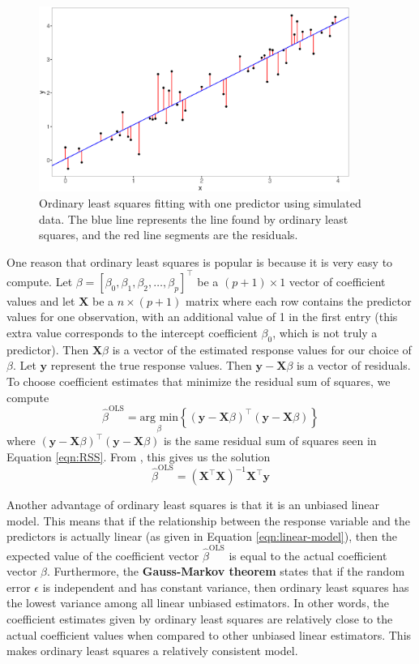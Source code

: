 \documentclass{article}
\newcommand{\argmin}[2]{\underset{#1}{\text{arg min}}\left\{#2\right\}}
\begin{document}
\begin{figure}[!h]
	\centering
	\includegraphics[width = 4in]{images/ols.eps}
	\captionsetup{width=4in}
	\caption{Ordinary least squares fitting with one predictor using simulated data. The blue line represents the line found by ordinary least squares, and the red line segments are the residuals.}
	\label{fig:ols}
\end{figure}

One reason that ordinary least squares is popular is because it is very easy to compute. Let $\beta = [\beta_0, \beta_1, \beta_2, \dotsc, \beta_p]^\top$ be a $(p + 1) \times 1$ vector of coefficient values and let $\mathbf{X}$ be a $n\times (p + 1)$ matrix where each row contains the predictor values for one observation, with an additional value of 1 in the first entry (this extra value corresponds to the intercept coefficient $\beta_0$, which is not truly a predictor). Then $\mathbf{X}\beta$ is a vector of the estimated response values for our choice of $\beta$. Let $\mathbf{y}$ represent the true response values. Then $\mathbf{y} - \mathbf{X}\beta$ is a vector of residuals. To choose coefficient estimates that minimize the residual sum of squares, we compute
\begin{equation}
	\hat{\beta}^{\text{OLS}} = \argmin{\beta}{(\mathbf{y} - \mathbf{X}\beta)^\top (\mathbf{y} - \mathbf{X}\beta)}
\end{equation}
where $(\mathbf{y} - \mathbf{X}\beta)^\top (\mathbf{y} - \mathbf{X}\beta)$ is the same residual sum of squares seen in Equation \ref{eqn:RSS}. From \cite{friedman2001elements}, this gives us the solution
\begin{equation}\label{eqn:ols-solution}
	\hat{\beta}^{\text{OLS}} = (\mathbf{X}^\top \mathbf{X})^{-1} \mathbf{X}^\top \mathbf{y}
\end{equation}

Another advantage of ordinary least squares is that it is an unbiased linear model. This means that if the relationship between the response variable and the predictors is actually linear (as given in Equation \ref{eqn:linear-model}), then the expected value of the coefficient vector $\hat{\beta}^\text{OLS}$ is equal to the actual coefficient vector $\beta$. Furthermore, the \textbf{Gauss-Markov theorem} states that if the random error $\epsilon$ is independent and has constant variance, then ordinary least squares has the lowest variance among all linear unbiased estimators. In other words, the coefficient estimates given by ordinary least squares are relatively close to the actual coefficient values when compared to other unbiased linear estimators. This makes ordinary least squares a relatively consistent model.
\end{document}
